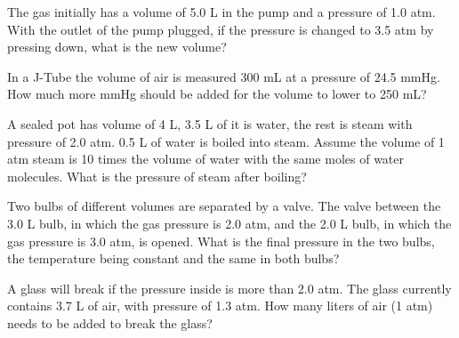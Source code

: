 \documentclass{article}
\begin{document}
\begin{custom-big}[Example 8]
The gas initially has a volume of 5.0 L in the pump and a pressure of 1.0 atm. With the outlet of the pump plugged, if the pressure is changed to 3.5 atm by pressing down, what is the new volume?
\end{custom-big}


\begin{custom-big}[Example 9]
In a J-Tube the volume of air is measured 300 mL at a pressure of 24.5 mmHg. How much more mmHg should be added for the volume to lower to 250 mL?
\end{custom-big}


\begin{custom-big}[Example 10]
A sealed pot has volume of 4 L, 3.5 L of it is water, the rest is steam with pressure of 2.0 atm. 0.5 L of water is boiled into steam. Assume the volume of 1 atm steam is 10 times the volume of water with the same moles of water molecules. What is the pressure of steam after boiling?
\end{custom-big}


\begin{custom-big}
Two bulbs of different volumes are separated by a valve. The valve between the 3.0 L bulb, in which the gas pressure is 2.0 atm, and the 2.0 L bulb, in which the gas pressure is 3.0 atm, is opened. What is the final pressure in the two bulbs, the temperature being constant and the same in both bulbs?
\end{custom-big}


\begin{custom-big}
A glass will break if the pressure inside is more than 2.0 atm. The glass currently contains 3.7 L of air, with pressure of 1.3 atm. How many liters of air (1 atm) needs to be added to break the glass?
\end{custom-big}
\end{document}
